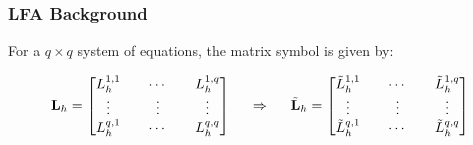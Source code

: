 \documentclass{beamer}
\begin{document}

\begin{frame}
\begin{center}
\frametitle{LFA Background}

For a $q \times q$ system of equations, the matrix symbol is given by:

\begin{equation}
\mathbf{L}_h =
\begin{bmatrix}
    L_h^{1, 1} && \cdots && L_h^{1, q}        \\
    \vdots               && \vdots && \vdots  \\
    L_h^{q, 1} && \cdots && L_h^{q, q}        \\
\end{bmatrix}
\hspace{0.5cm}
\Rightarrow
\hspace{0.5cm}
\tilde{\mathbf{L}}_h =
\begin{bmatrix}
    \tilde{L}_h^{1, 1} && \cdots && \tilde{L}_h^{1, q}  \\
    \vdots             && \vdots && \vdots              \\
    \tilde{L}_h^{q, 1} && \cdots && \tilde{L}_h^{q, q}  \\
\end{bmatrix}
\end{equation}

\end{center}
\end{frame}

\end{document}
